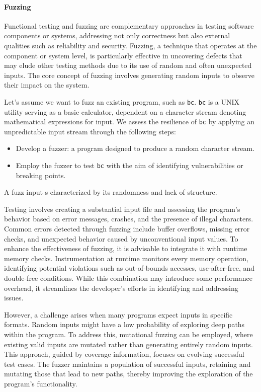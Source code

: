 \paragraph*{Fuzzing}
Functional testing and fuzzing are complementary approaches in testing software components or systems, addressing not only correctness but also external qualities such as reliability and security.
Fuzzing, a technique that operates at the component or system level, is particularly effective in uncovering defects that may elude other testing methods due to its use of random and often unexpected inputs.
The core concept of fuzzing involves generating random inputs to observe their impact on the system. 
\begin{example}
    Let's assume we want to fuzz an existing program, such as \texttt{bc}. 
    \texttt{bc} is a UNIX utility serving as a basic calculator, dependent on a character stream denoting mathematical expressions for input.
    We assess the resilience of \texttt{bc} by applying an unpredictable input stream through the following steps:
    \begin{itemize}
        \item Develop a fuzzer: a program designed to produce a random character stream.
        \item Employ the fuzzer to test \texttt{bc} with the aim of identifying vulnerabilities or breaking points.
    \end{itemize}
\end{example}
\begin{definition}
    A fuzz input s characterized by its randomness and lack of structure. 
\end{definition}
Testing involves creating a substantial input file and assessing the program's behavior based on error messages, crashes, and the presence of illegal characters.
Common errors detected through fuzzing include buffer overflows, missing error checks, and unexpected behavior caused by unconventional input values. 
To enhance the effectiveness of fuzzing, it is advisable to integrate it with runtime memory checks. 
Instrumentation at runtime monitors every memory operation, identifying potential violations such as out-of-bounds accesses, use-after-free, and double-free conditions. 
While this combination may introduce some performance overhead, it streamlines the developer's efforts in identifying and addressing issues.

However, a challenge arises when many programs expect inputs in specific formats. 
Random inputs might have a low probability of exploring deep paths within the program.
To address this, mutational fuzzing can be employed, where existing valid inputs are mutated rather than generating entirely random inputs. 
This approach, guided by coverage information, focuses on evolving successful test cases. 
The fuzzer maintains a population of successful inputs, retaining and mutating those that lead to new paths, thereby improving the exploration of the program's functionality.